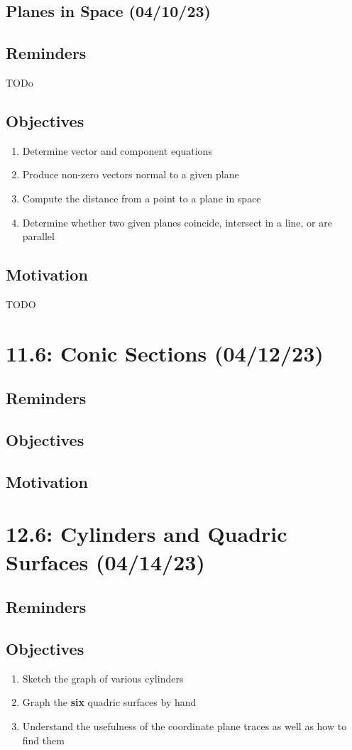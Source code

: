 \documentclass{report}
\begin{document}
\begin{sloppypar}
\section{Planes in Space (04/10/23)}
\section{Reminders}
TODo
\section{Objectives}
\begin{enumerate}
  \item Determine vector and component equations
  \item Produce non-zero vectors normal to a given plane
  \item Compute the distance from a point to a plane
        in space
  \item Determine whether two given planes coincide, intersect in a line, or are parallel

\end{enumerate}

\section{Motivation}
TODO
\chapter{11.6: Conic Sections (04/12/23)}
\section{Reminders}
\section{Objectives}
\section{Motivation}
\chapter{12.6: Cylinders and Quadric Surfaces (04/14/23)}
\section{Reminders}
\section{Objectives}
\begin{enumerate}
  \item Sketch the graph of various cylinders
  \item Graph the \textbf{six} quadric surfaces by hand
  \item Understand the usefulness of the coordinate plane
        traces as well as how to find them


\end{enumerate}
\end{sloppypar}
\end{document}

